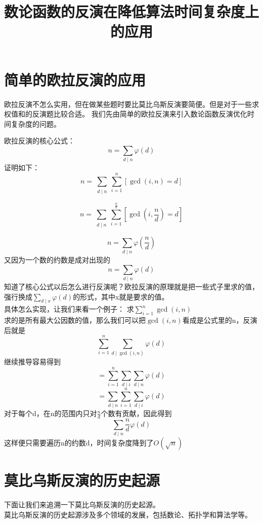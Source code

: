 \documentclass{hfutreport}
\title{数论函数的反演在降低算法时间复杂度上的应用}
\begin{document}
\maketitle

\pagestyle{plain}
\tableofcontents
\newpage
\pagestyle{plain}

\setcounter{page}{1}

\section{简单的欧拉反演的应用}

欧拉反演不怎么实用，但在做某些题时要比莫比乌斯反演要简便。但是对于一些求权值和的反演题比较合适。
我们先由简单的欧拉反演来引入数论函数反演优化时间复杂度的问题。

欧拉反演的核心公式：
\[
    n = \sum_{d \mid n} \varphi(d)
\]
证明如下：
\[
    n = \sum_{\substack{d \mid n}} \sum_{i=1}^{n} \left[ \gcd(i, n) = d \right]
\]

\[
    n = \sum_{\substack{d \mid n}} \sum_{i=1}^{\frac{n}{d}}\left[ \gcd(i, \frac{n}{d}) = d \right]
\]

\[
    n = \sum_{d \mid n} \varphi(\frac{n}{d})  
\]
又因为一个数的约数是成对出现的
\[
    n = \sum_{d \mid n} \varphi(d)
\]
知道了核心公式以后怎么进行反演呢？欧拉反演的原理就是把一些式子里求的值，强行换成$\sum_{d \mid x} \varphi(d)$的形式，其中x就是要求的值。\\
具体怎么实现，让我们来看一个例子：
求$\sum_{i=1}^{n} \gcd(i,n)$ \\
求的是所有最大公因数的值，那么我们可以把$\gcd(i,n)$看成是公式里的n，反演后就是
\[
    \sum_{i=1}^{n} \sum_{d \mid \gcd(i,n)} \varphi(d)
\]
继续推导容易得到
\[
    =\sum_{i=1}^{n} \sum_{d \mid i} \sum_{d \mid n} \varphi(d)
\]
\[
    =\sum_{d \mid n} \sum_{i=1}^{n} \sum_{d \mid i} \varphi(d)
\]
对于每个d，在n的范围内只对$\frac{n}{d}$个数有贡献，因此得到
\[
    \sum_{d \mid n} \frac{n}{d} \varphi(d)
\]
这样便只需要遍历n的约数d，时间复杂度降到了$O(\sqrt{n})$




\section{莫比乌斯反演的历史起源}

下面让我们来追溯一下莫比乌斯反演的历史起源。\\

莫比乌斯反演的历史起源涉及多个领域的发展，包括数论、拓扑学和算法学等。\\
\end{document}
